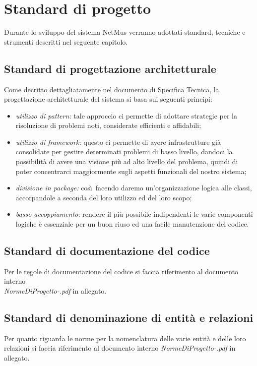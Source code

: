 \chapter{Standard di progetto}
\thispagestyle{fancy} %
Durante lo sviluppo del sistema NetMus verranno adottati standard,
tecniche e strumenti descritti nel seguente capitolo.

\section{Standard di progettazione architetturale}
Come decritto dettagliatamente nel documento di Specifica Tecnica, la
progettazione architetturale del sistema si basa sui seguenti principi:

\begin{itemize}
  \item \emph{utilizzo di pattern:} tale approccio ci permette di adottare
  strategie per la risoluzione di problemi noti, considerate efficienti e affidabili;
  \item \emph{utilizzo di framework:} questo ci permette di avere infrastrutture
  gi\`a consolidate per gestire determinati problemi di basso livello, dandoci
  la possibilit\`a di avere una visione pi\`u ad alto livello del problema,
  quindi di poter concentrarci maggiormente sugli aspetti funzionali del nostro
  sistema;
  \item \emph{divisione in package:} cos\`\i\ facendo daremo un'organizzazione
  logica alle classi, accorpandole a seconda del loro utilizzo ed del loro
  scopo;
  \item \emph{basso accoppiamento:} rendere il pi\`u possibile indipendenti le
  varie componenti logiche \`e essenziale per un buon riuso ed una facile
  manutenzione del codice.
\end{itemize}

\section{Standard di documentazione del codice}
Per le regole di documentazione del codice si faccia riferimento al documento
interno\\ \emph{NormeDiProgetto-\versionenormeprogetto.pdf} in allegato.

\section{Standard di denominazione di entit\`a e relazioni}
Per quanto riguarda le norme per la nomenclatura delle varie entit\`a e delle
loro relazioni si faccia riferimento al documento interno
\emph{NormeDiProgetto-\versionenormeprogetto.pdf} in allegato.

